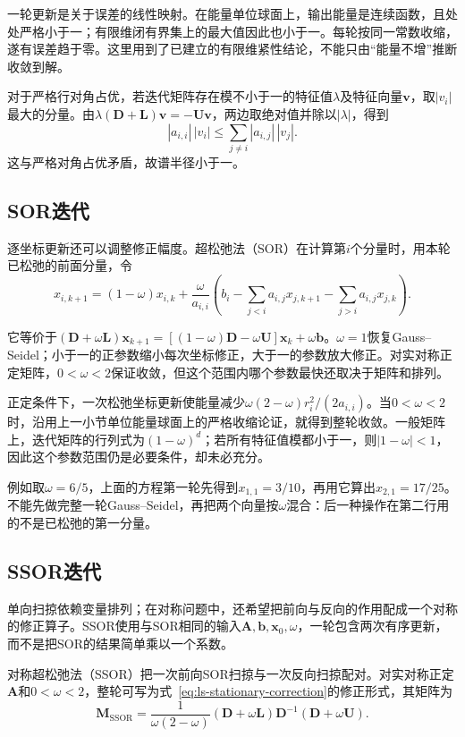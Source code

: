 一轮更新是关于误差的线性映射。在能量单位球面上，输出能量是连续函数，且处处严格小于一；有限维闭有界集上的最大值因此也小于一。每轮按同一常数收缩，遂有误差趋于零。这里用到了已建立的有限维紧性结论，不能只由“能量不增”推断收敛到解。

对于严格行对角占优，若迭代矩阵存在模不小于一的特征值$\lambda$及特征向量$\bm v$，取$|v_i|$最大的分量。由$\lambda(\bm D+\bm L)\bm v=-\bm U\bm v$，两边取绝对值并除以$|\lambda|$，得到
\[
 |a_{i,i}|\,|v_i|\leq\sum_{j\ne i}|a_{i,j}|\,|v_j|.
\]
这与严格对角占优矛盾，故谱半径小于一。

\subsection{SOR迭代}

逐坐标更新还可以调整修正幅度。超松弛法（SOR）在计算第$i$个分量时，用本轮已松弛的前面分量，令
\begin{equation}
 x_{i,k+1}=(1-\omega)x_{i,k}+
 \frac{\omega}{a_{i,i}}\left(b_i-\sum_{j<i}a_{i,j}x_{j,k+1}-\sum_{j>i}a_{i,j}x_{j,k}\right).
 \label{eq:ls-sor-update}
\end{equation}

它等价于$(\bm D+\omega\bm L)\bm x_{k+1}=[(1-\omega)\bm D-\omega\bm U]\bm x_{k}+\omega\bm b$。$\omega=1$恢复Gauss--Seidel；小于一的正参数缩小每次坐标修正，大于一的参数放大修正。对实对称正定矩阵，$0<\omega<2$保证收敛，但这个范围内哪个参数最快还取决于矩阵和排列。

正定条件下，一次松弛坐标更新使能量减少$\omega(2-\omega)r_i^2/(2a_{i,i})$。当$0<\omega<2$时，沿用上一小节单位能量球面上的严格收缩论证，就得到整轮收敛。一般矩阵上，迭代矩阵的行列式为$(1-\omega)^d$；若所有特征值模都小于一，则$|1-\omega|<1$，因此这个参数范围仍是必要条件，却未必充分。

例如取$\omega=6/5$，上面的方程第一轮先得到$x_{1,1}=3/10$，再用它算出$x_{2,1}=17/25$。不能先做完整一轮Gauss--Seidel，再把两个向量按$\omega$混合：后一种操作在第二行用的不是已松弛的第一分量。

\subsection{SSOR迭代}

单向扫掠依赖变量排列；在对称问题中，还希望把前向与反向的作用配成一个对称的修正算子。SSOR使用与SOR相同的输入$\bm A,\bm b,\bm x_0,\omega$，一轮包含两次有序更新，而不是把SOR的结果简单乘以一个系数。

对称超松弛法（SSOR）把一次前向SOR扫掠与一次反向扫掠配对。对实对称正定$\bm A$和$0<\omega<2$，整轮可写为式~\eqref{eq:ls-stationary-correction}的修正形式，其矩阵为
\[
 \bm M_{\mathrm{SSOR}}=\frac{1}{\omega(2-\omega)}
 (\bm D+\omega\bm L)\bm D^{-1}(\bm D+\omega\bm U).
\]

